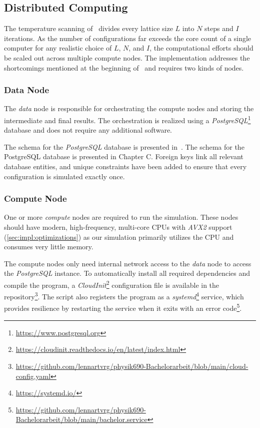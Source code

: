 \subsection{Distributed Computing}\label{sec:impl:computing}
	The temperature scanning of~ divides every lattice size $L$ into $N$ steps and $I$ iterations. As the number of configurations far exceeds the core count of a single computer for any realistic choice of $L$, $N$, and $I$, the computational efforts should be scaled out across multiple compute nodes. The implementation addresses the shortcomings mentioned at the beginning of~ and requires two kinds of nodes.
	
	\subsubsection{Data Node}\label{sec:impl:computing:data}
		The \emph{data} node is responsible for orchestrating the compute nodes and storing the intermediate and final results. The orchestration is realized using a  \emph{PostgreSQL}\footnote{\url{https://www.postgresql.org}} database and does not require any additional software.
		
		The schema for the \emph{PostgreSQL} database is presented in~. The schema for the PostgreSQL database is presented in Chapter C. Foreign keys link all relevant database entities, and unique constraints have been added to ensure that every configuration is simulated exactly once.
	
	\subsubsection{Compute Node}\label{sec:impl:computing:compute}
		One or more \emph{compute} nodes are required to run the simulation. These nodes should have modern, high-frequency, multi-core CPUs with \emph{AVX2} support (\cref{sec:impl:optimizations}) as our simulation primarily utilizes the CPU and consumes very little memory.
		
		The compute nodes only need internal network access to the \emph{data} node to access the \emph{PostgreSQL} instance. To automatically install all required dependencies and compile the program, a \emph{CloudInit}\footnote{\url{https://cloudinit.readthedocs.io/en/latest/index.html}} configuration file is available in the repository\footnote{\url{https://github.com/lennartvrg/physik690-Bachelorarbeit/blob/main/cloud-config.yaml}}. The script also registers the program as a \emph{systemd}\footnote{\url{https://systemd.io/}} service, which provides resilience by restarting the service when it exits with an error code\footnote{\url{https://github.com/lennartvrg/physik690-Bachelorarbeit/blob/main/bachelor.service}}.
